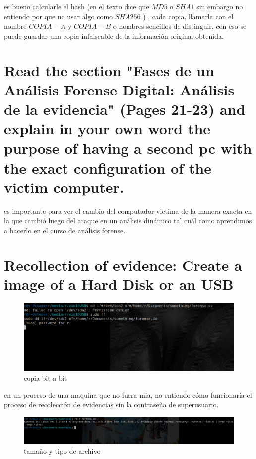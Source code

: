 \documentclass[10pt,a4paper]{article} %
\begin{document}
        es bueno calcularle el hash (en el texto dice que $MD5$ o $SHA1$ sin
        embargo no entiendo por que no usar algo como $SHA256$ ) , cada copia,
        llamarla con el nombre $COPIA-A$ y $COPIA-B$  o nombres sencillos de
        distinguir, con eso se puede guardar una copia infalseable de la
        información original obtenida.

    \section{Read the section "Fases de un Análisis Forense Digital: Análisis
    de la evidencia" (Pages 21-23) and explain in your own word the purpose of
    having a second pc with the exact configuration of the victim computer.}

        es importante para ver el cambio del computador victima de la manera
        exacta en la que cambió luego del ataque en un análisis dinámico tal
        cuál como aprendimos a hacerlo en el curso de análisis forense.


    \newpage
    \section{Recollection of evidence: Create a image of a Hard Disk or an USB}
        \begin{figure}[h!]
            \centering
            \includegraphics[width=0.8\linewidth]{sudo.png}
            \caption{copia bit a bit}
            \label{copia}
        \end{figure}

        en un proceso de una maquina que no fuera mia, no entiendo cómo
        funcionaría el proceso de recolección de evidencias sin la contraseña
        de superusuario.

        \begin{figure}[h!]
            \centering
            \includegraphics[width=0.8\linewidth]{tam.png}
            \caption{tamaño y tipo de archivo}
            \label{fig}
        \end{figure}
\end{document}
